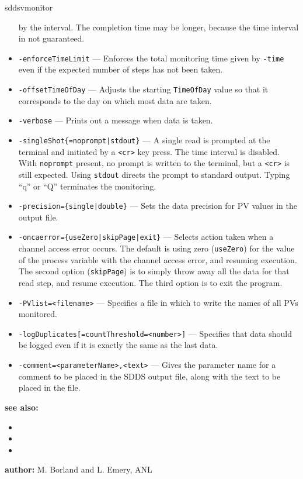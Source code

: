 \begin{sddsprog}{sddsvmonitor}
\begin{itemize}
                by the interval. The completion time may be longer, because the time interval in not guaranteed.
  \item {\tt -enforceTimeLimit} --- Enforces the total monitoring time given by \verb+-time+ even if
                the expected number of steps has not been taken.
  \item {\tt -offsetTimeOfDay} --- Adjusts the starting \verb+TimeOfDay+ value so that it corresponds
                to the day on which most data are taken.
  \item {\tt -verbose} --- Prints out a message when data is taken.
  \item {\verb+-singleShot{=noprompt|stdout}+} --- A single read is prompted at the terminal
                and initiated by a \verb+<cr>+ key press. The time interval is disabled.
                With \verb+noprompt+ present, no prompt is written to the terminal, but a \verb+<cr>+
                is still expected. Using \verb+stdout+ directs the prompt to standard output.
                Typing ``q'' or ``Q'' terminates the monitoring.
  \item {\tt -precision=\{single|double\}} --- Sets the data precision for PV values in the output file.
  \item {\tt -oncaerror=\{useZero|skipPage|exit\}} --- Selects action taken when a channel access error occurs.
                The default is using zero (\verb+useZero+) for the value of the process variable
                with the channel access error, and resuming execution. The second option (\verb+skipPage+) is to
                simply throw away all the data for that read step, and resume execution.
                The third option is to exit the program.
  \item {\tt -PVlist=<filename>} --- Specifies a file in which to write
                the names of all PVs monitored.
  \item {\verb+-logDuplicates[=countThreshold=<number>]+} --- Specifies that data should be
                logged even if it is exactly the same as the last data.
  \item {\verb+-comment=<parameterName>,<text>+} ---
                Gives the parameter name for a comment to be placed in the SDDS output file,
                along with the text to be placed in the file.
\end{itemize}

\item \textbf{see also:}
\begin{itemize}
  \item {}
  \item {}
  \item {}
\end{itemize}
\item \textbf{author:} M. Borland and L. Emery, ANL
\end{sddsprog}
